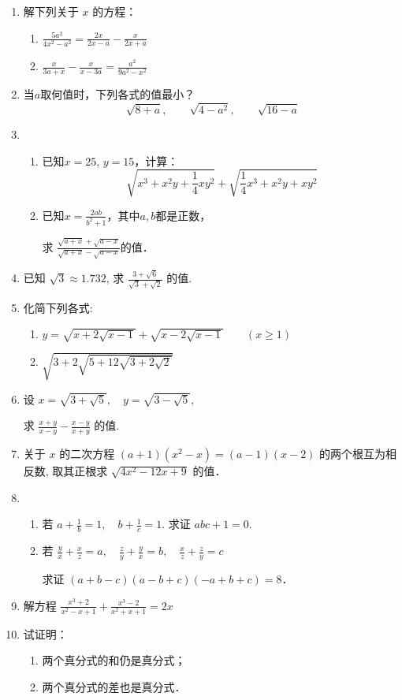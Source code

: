 \begin{enumerate}
\item 解下列关于 $x$ 的方程：
\begin{enumerate}
\item $\frac{5 a^{2}}{4 x^{2}-a^{2}}=\frac{2 x}{2 x-a}-\frac{x}{2 x+a}$
\item $\frac{x}{3 a+x}-\frac{x}{x-3 a}=\frac{a^{2}}{9 a^{2}-x^{2}}$
\end{enumerate}

\item 当$a$取何值时，下列各式的值最小？
\[\sqrt{8+a},\qquad \sqrt{4-a^2},\qquad \sqrt{16-a}  \]

\item \begin{enumerate}
    \item 已知$x=25$, $y=15$，计算：
    \[\sqrt{x^3+x^2y+\frac{1}{4}xy^2}+\sqrt{\frac{1}{4}x^3+x^2y+xy^2} \]
    \item 已知$x=\frac{2ab}{b^2+1}$，其中$a,b$都是正数，
    
    求 $\frac{\sqrt{a+x}+\sqrt{a-x}}{\sqrt{a+x}-\sqrt{a-x}}$的值．
\end{enumerate}

\item 已知 $\sqrt{3} \approx 1.732$, 求 $\frac{3+\sqrt{6}}{\sqrt{3}+\sqrt{2}}$ 的值.
\item 化简下列各式:
\begin{enumerate}
    \item $y=\sqrt{x+2 \sqrt{x-1}}+\sqrt{x-2 \sqrt{x-1}}\qquad (x \geqslant 1)$
    \item $\sqrt{3+2 \sqrt{5+12 \sqrt{3+2 \sqrt{2}}}}$
\end{enumerate}

\item 设 $x=\sqrt{3+\sqrt{5}},\quad  y=\sqrt{3-\sqrt{5}}$,

求 $\frac{x+y}{x-y}-\frac{x-y}{x+y}$ 的值.
\item 关于 $x$ 的二次方程 $(a+1)\left(x^{2}-x\right)=(a-1)(x-2)$
的两个根互为相反数, 取其正根求 $\sqrt{4 x^{2}-12 x+9}$ 的值．
\item 
\begin{enumerate}
    \item 若 $a+\frac{1}{b}=1, \quad b+\frac{1}{c}=1$. 求证 $a b c+1=0$.
    \item 若 $\frac{y}{x}+\frac{x}{z}=a,\quad  \frac{z}{y}+\frac{y}{x}=b,\quad  \frac{x}{z}+\frac{z}{y}=c$
    
求证 $(a+b-c)(a-b+c)(-a+b+c)=8$．
\end{enumerate}


\item 解方程 $\frac{x^{3}+2}{x^{2}-x+1}+\frac{x^{3}-2}{x^{2}+x+1}=2 x$
\item 试证明：
\begin{enumerate}
    \item 两个真分式的和仍是真分式；
    \item 两个真分式的差也是真分式．
\end{enumerate}

\end{enumerate}

